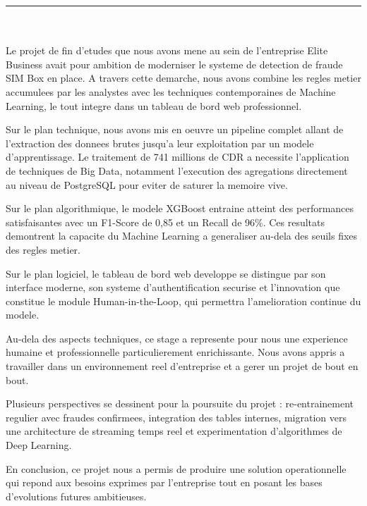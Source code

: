 \documentclass[12pt, oneside, a4paper]{report}
\newcommand{\chapterhead}[1]{%
  \noindent\rule[-0.2cm]{0.45cm}{1.2cm}\hspace{0.15cm}%
  \raisebox{0.85cm}{\rule{0.85\textwidth}{0.5pt}}\\[0.3cm]
  \noindent\hspace*{0.6cm}{\Huge\textbf{#1}}\\[1.5cm]
}
\begin{document}

\clearpage
\thispagestyle{plain}
\chapterhead{CONCLUSION GÉNÉRALE}

Le projet de fin d'etudes que nous avons mene au sein de l'entreprise Elite Business avait pour ambition de moderniser le systeme de detection de fraude SIM Box en place. A travers cette demarche, nous avons combine les regles metier accumulees par les analystes avec les techniques contemporaines de Machine Learning, le tout integre dans un tableau de bord web professionnel.

Sur le plan technique, nous avons mis en oeuvre un pipeline complet allant de l'extraction des donnees brutes jusqu'a leur exploitation par un modele d'apprentissage. Le traitement de 741 millions de CDR a necessite l'application de techniques de Big Data, notamment l'execution des agregations directement au niveau de PostgreSQL pour eviter de saturer la memoire vive.

Sur le plan algorithmique, le modele XGBoost entraine atteint des performances satisfaisantes avec un F1-Score de 0,85 et un Recall de 96\%. Ces resultats demontrent la capacite du Machine Learning a generaliser au-dela des seuils fixes des regles metier.

Sur le plan logiciel, le tableau de bord web developpe se distingue par son interface moderne, son systeme d'authentification securise et l'innovation que constitue le module Human-in-the-Loop, qui permettra l'amelioration continue du modele.

Au-dela des aspects techniques, ce stage a represente pour nous une experience humaine et professionnelle particulierement enrichissante. Nous avons appris a travailler dans un environnement reel d'entreprise et a gerer un projet de bout en bout.

Plusieurs perspectives se dessinent pour la poursuite du projet : re-entrainement regulier avec fraudes confirmees, integration des tables internes, migration vers une architecture de streaming temps reel et experimentation d'algorithmes de Deep Learning.

En conclusion, ce projet nous a permis de produire une solution operationnelle qui repond aux besoins exprimes par l'entreprise tout en posant les bases d'evolutions futures ambitieuses.
\end{document}
